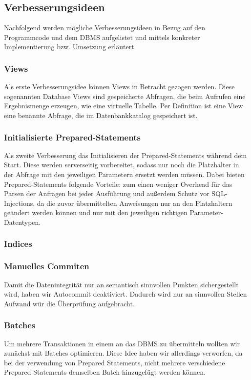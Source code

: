 \subsection{Verbesserungsideen}\label{subsec:verbesserungsideen}
Nachfolgend werden mögliche Verbesserungsideen in Bezug auf den Programmcode und dem DBMS aufgelistet und mittels konkreter Implementierung bzw. Umsetzung erläutert.
\subsubsection{Views}
Als erste Verbesserungsidee können Views in Betracht gezogen werden.
Diese sogenannten Database Views sind gespeicherte Abfragen, die beim Aufrufen eine Ergebnismenge erzeugen, wie eine virtuelle Tabelle.
Per Definition ist eine View eine benannte Abfrage, die im Datenbankkatalog gespeichert ist.

\subsubsection{Initialisierte Prepared-Statements}
Als zweite Verbesserung das Initialisieren der Prepared-Statements während dem Start.
Diese werden serverseitig vorbereitet, sodass nur noch die Platzhalter in der Abfrage mit den jeweiligen Parametern ersetzt werden müssen.
Dabei bieten Prepared-Statements folgende Vorteile: zum einen weniger Overhead für das Parsen der Anfragen bei jeder Ausführung und außerdem Schutz vor SQL-Injections, da die zuvor übermittelten Anweisungen nur an den Platzhaltern geändert werden können und nur mit den jeweiligen richtigen Parameter-Datentypen.
\subsubsection{Indices}

\subsubsection{Manuelles Commiten}
    Damit die Datenintegrität nur an semantisch sinnvollen Punkten sichergestellt wird, haben wir Autocommit deaktiviert.
    Dadurch wird nur an sinnvollen Stellen Aufwand wür die Überprüfung aufgebracht.

\subsubsection{Batches}
    Um mehrere Transaktionen in einem an das DBMS zu übermitteln wollten wir zunächst mit Batches optimieren.
    Diese Idee haben wir allerdings verworfen, da bei der verwendung von Prepared Statements, nicht mehrere verschiedene Prepared Statements demselben Batch hinzugefügt werden können.

